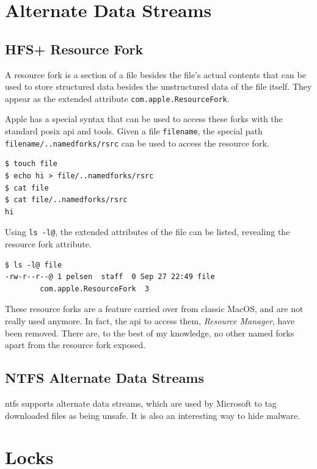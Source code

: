 \documentclass[a4paper]{article}
\begin{document}
\section{Alternate Data Streams}\label{sec:ads}

\subsection{HFS+ Resource Fork}

A resource fork is a section of a file besides the file's actual contents that can be used to store structured data besides the unstructured data of the file itself. They appear as the extended attribute \verb|com.apple.ResourceFork|. 

Apple has a special syntax that can be used to access these forks with the standard \gls{posix} \gls{api} and tools. Given a file \verb|filename|, the special path \verb|filename/..namedforks/rsrc| can be used to access the resource fork.

\begin{verbatim}
$ touch file
$ echo hi > file/..namedforks/rsrc
$ cat file
$ cat file/..namedforks/rsrc
hi  
\end{verbatim}

Using \verb|ls -l@|, the extended attributes of the file can be listed, revealing the resource fork attribute.

\begin{verbatim}
$ ls -l@ file
-rw-r--r--@ 1 pelsen  staff  0 Sep 27 22:49 file
        com.apple.ResourceFork  3  
\end{verbatim}

These resource forks are a feature carried over from classic MacOS, and are not really used anymore. In fact, the \gls{api} to access them, \emph{Resource Manager}, have been removed. There are, to the best of my knowledge, no other named forks apart from the resource fork exposed.

\subsection{NTFS Alternate Data Streams}


\gls{ntfs} supports alternate data streams, which are used by Microsoft to tag downloaded files as being unsafe. It is also an interesting way to hide malware.

\section{Locks}
\end{document}
